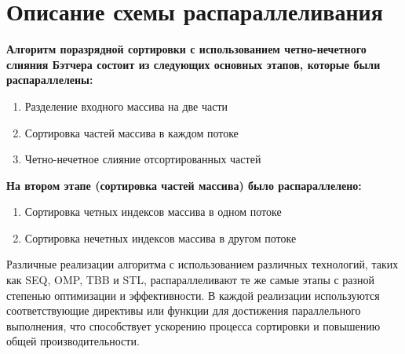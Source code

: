 \documentclass{report}
\begin{document}
\newpage

\section*{Описание схемы распараллеливания}
\par \textbf{Алгоритм поразрядной сортировки с использованием четно-нечетного слияния Бэтчера состоит из следующих основных этапов, которые были распараллелены:}
\begin{enumerate}
\item Разделение входного массива на две части
\item Сортировка частей массива в каждом потоке
\item Четно-нечетное слияние отсортированных частей
\end{enumerate}
\vspace{2em}
\par \textbf{На втором этапе (сортировка частей массива) было распараллелено:}
\begin{enumerate}
\item Сортировка четных индексов массива в одном потоке
\item Сортировка нечетных индексов массива в другом потоке
\end{enumerate}
\vspace{1em}
\par Различные реализации алгоритма с использованием различных технологий, таких как SEQ, OMP, TBB и STL, распараллеливают те же самые этапы с разной степенью оптимизации и эффективности. В каждой реализации используются соответствующие директивы или функции для достижения параллельного выполнения, что способствует ускорению процесса сортировки и повышению общей производительности.

\newpage


\end{document}
